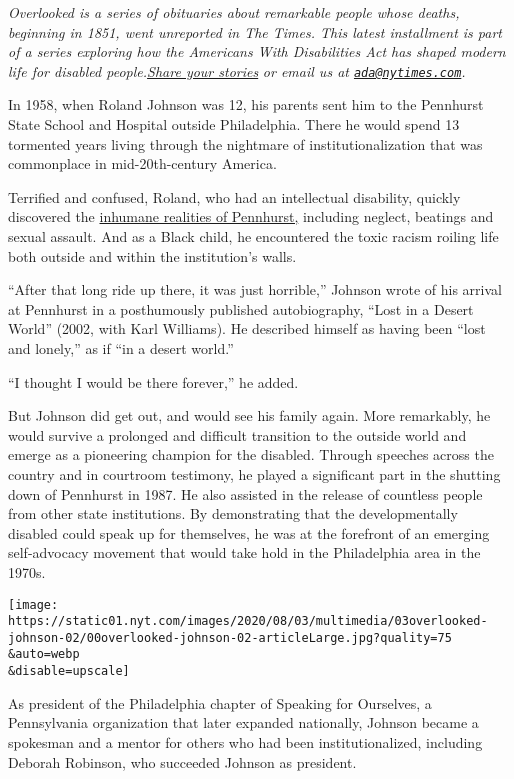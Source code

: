 \emph{Overlooked is a series of obituaries about remarkable people whose
deaths, beginning in 1851, went unreported in The Times. This latest
installment is part of a series exploring how the Americans With
Disabilities Act has shaped modern life for disabled
people.}\href{https://www.nytimes.com/2020/07/10/reader-center/disability-america-questions.html}{\emph{Share
your stories}} \emph{or email us at
\href{mailto:ada@nytimes.com}{\nolinkurl{ada@nytimes.com}}.}

In 1958, when Roland Johnson was 12, his parents sent him to the
Pennhurst State School and Hospital outside Philadelphia. There he would
spend 13 tormented years living through the nightmare of
institutionalization that was commonplace in mid-20th-century America.

Terrified and confused, Roland, who had an intellectual disability,
quickly discovered the
\href{https://timesmachine.nytimes.com/timesmachine/1983/11/04/017104.html?pageNumber=38}{inhumane
realities of Pennhurst,} including neglect, beatings and sexual assault.
And as a Black child, he encountered the toxic racism roiling life both
outside and within the institution's walls.

``After that long ride up there, it was just horrible,'' Johnson wrote
of his arrival at Pennhurst in a posthumously published autobiography,
``Lost in a Desert World'' (2002, with Karl Williams). He described
himself as having been ``lost and lonely,'' as if ``in a desert world.''

``I thought I would be there forever,'' he added.

But Johnson did get out, and would see his family again. More
remarkably, he would survive a prolonged and difficult transition to the
outside world and emerge as a pioneering champion for the disabled.
Through speeches across the country and in courtroom testimony, he
played a significant part in the shutting down of Pennhurst in 1987. He
also assisted in the release of countless people from other state
institutions. By demonstrating that the developmentally disabled could
speak up for themselves, he was at the forefront of an emerging
self-advocacy movement that would take hold in the Philadelphia area in
the 1970s.

\texttt{[image: https://static01.nyt.com/images/2020/08/03/multimedia/03overlooked-johnson-02/00overlooked-johnson-02-articleLarge.jpg?quality=75\\\&auto=webp\\\&disable=upscale]}

As president of the Philadelphia chapter of Speaking for Ourselves, a
Pennsylvania organization that later expanded nationally, Johnson became
a spokesman and a mentor for others who had been institutionalized,
including Deborah Robinson, who succeeded Johnson as president.

